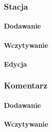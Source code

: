 \subsubsection{Stacja}
\paragraph{Dodawanie}
\paragraph{Wczytywanie}
\paragraph{Edycja}
\subsubsection{Komentarz}
\paragraph{Dodawanie}
\paragraph{Wczytywanie}
